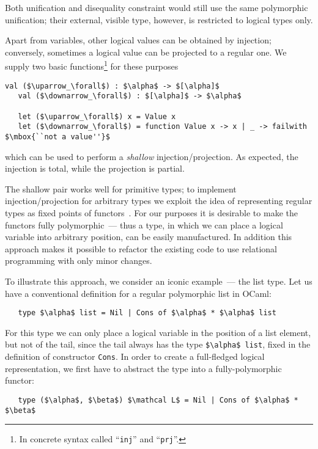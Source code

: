 Both unification and disequality constraint would still use the same polymorphic unification; their external, visible type,
however, is restricted to logical types only.

Apart from variables, other logical values can be obtained by injection; conversely, sometimes a logical value can be projected to
a regular one. We supply two basic functions\footnote{In concrete syntax called ``\lstinline{inj}'' and ``\lstinline{prj}''.}
for these purposes

\begin{lstlisting}[mathescape=true]
   val ($\uparrow_\forall$) : $\alpha$ -> $[\alpha]$
   val ($\downarrow_\forall$) : $[\alpha]$ -> $\alpha$

   let ($\uparrow_\forall$) x = Value x
   let ($\downarrow_\forall$) = function Value x -> x | _ -> failwith $\mbox{``not a value''}$
\end{lstlisting}

\noindent which can be used to perform a \emph{shallow} injection/projection. As expected, the injection is total, while the projection is partial.

The shallow pair works well for primitive types; to implement injection/projection for arbitrary types we exploit the
idea of representing regular types as fixed points of functors~\cite{ALaCarte}. For our purposes it is desirable to make
the functors fully polymorphic~--- thus a type, in which we can place a logical variable into arbitrary position,
can be easily manufactured. In addition this approach makes it possible to refactor the existing code to use relational
programming with only minor changes.

To illustrate this approach, we consider an iconic example~--- the list type. Let us have a conventional definition
for a regular polymorphic list in OCaml:

\begin{lstlisting}
   type $\alpha$ list = Nil | Cons of $\alpha$ * $\alpha$ list
\end{lstlisting}

For this type we can only place a logical variable in the position of a list element, but not of the tail, since the tail
always has the type \lstinline{$\alpha$ list}, fixed in the definition of constructor \lstinline{Cons}. In order to create
a full-fledged logical representation, we first have to abstract the type into a fully-polymorphic functor:

\begin{lstlisting}
   type ($\alpha$, $\beta$) $\mathcal L$ = Nil | Cons of $\alpha$ * $\beta$
\end{lstlisting}


